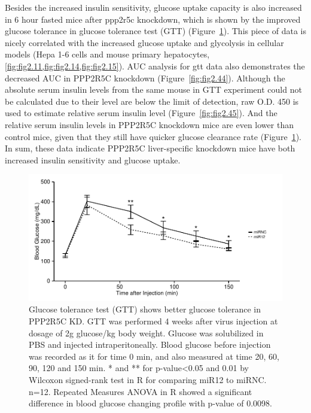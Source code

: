 Besides the increased insulin sensitivity, glucose uptake capacity is also increased in 6 hour fasted mice after \gls{ppp2r5c} knockdown, which is shown by the improved glucose tolerance in glucose tolerance test (GTT) (Figure~\ref{fig:fig2.43}). This piece of data is nicely correlated with the increased glucose uptake and glycolysis in cellular models (Hepa 1-6 cells and mouse primary hepatocytes, \cref{fig:fig2.11,fig:fig2.14,fig:fig2.15}). AUC analysis for \gls{gtt} data also demonstrates the decreased AUC in PPP2R5C knockdown (Figure~\ref{fig:fig2.44}). Although the absolute serum insulin levels from the same mouse in GTT experiment could not be calculated due to their level are below the limit of detection, raw O.D. 450 is used to estimate relative serum insulin level (Figure~\ref{fig:fig2.45}). And the relative serum insulin levels in PPP2R5C knockdown mice are even lower than control mice, given that they still have quicker glucose clearance rate (Figure~\ref{fig:fig2.43}). In sum, these data indicate PPP2R5C liver-specific knockdown mice have both increased insulin sensitivity and glucose uptake. 

\begin{figure}[htbp]
\centering
\includegraphics[width=1\textwidth]{figs/fig2-43 gtt.pdf}
\caption[GTT shows better glucose tolerance in PPP2R5C KD]{\footnotesize Glucose tolerance test (GTT) shows better glucose tolerance in PPP2R5C KD. GTT was performed 4 weeks after virus injection at dosage of 2g glucose/kg body weight. Glucose was solubilized in PBS and injected intraperitoneally. Blood glucose before injection was recorded as it for time 0 min, and also measured at time 20, 60, 90, 120 and 150 min. * and ** for p-value<0.05 and 0.01 by Wilcoxon signed-rank test in R for comparing miR12 to miRNC. n=12. Repeated Measures \gls{ANOVA} in R showed a significant difference in blood glucose changing profile with p-value of 0.0098.}
\label{fig:fig2.43}
\end{figure}

